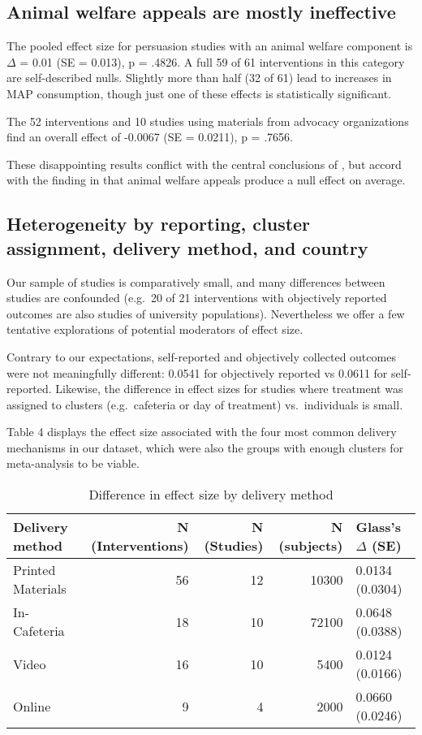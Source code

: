 \documentclass[sn-nature,pdflatex]{sn-jnl}
\begin{document}
\subsection{Animal welfare appeals are mostly ineffective}\label{sec2.9}

The pooled effect size for persuasion studies with an animal welfare
component is \(\Delta\) = 0.01 (SE = 0.013), p = .4826. A full 59 of 61
interventions in this category are self-described nulls. Slightly more
than half (32 of 61) lead to increases in MAP consumption, though just
one of these effects is statistically significant.

The 52 interventions and 10 studies using materials from advocacy
organizations find an overall effect of -0.0067 (SE = 0.0211), p =
.7656.

These disappointing results conflict with the central conclusions of
\citep{mathur2021effectiveness}, but accord with the finding in
\citep{DiGennaro2024} that animal welfare appeals produce a null effect
on average.

\subsection{Heterogeneity by reporting, cluster assignment, delivery
method, and country}\label{sec2.10}

Our sample of studies is comparatively small, and many differences
between studies are confounded (e.g.~20 of 21 interventions with
objectively reported outcomes are also studies of university
populations). Nevertheless we offer a few tentative explorations of
potential moderators of effect size.

Contrary to our expectations, self-reported and objectively collected
outcomes were not meaningfully different: 0.0541 for objectively
reported vs 0.0611 for self-reported. Likewise, the difference in effect
sizes for studies where treatment was assigned to clusters
(e.g.~cafeteria or day of treatment) vs.~individuals is small.

Table 4 displays the effect size associated with the four most common
delivery mechanisms in our dataset, which were also the groups with
enough clusters for meta-analysis to be viable.

\begin{table}[!h]
\centering
\caption{\label{tab:tab:table_four}Difference in effect size by delivery method}
\centering
\begin{tabular}[t]{lrrrl}
\toprule
Delivery method & N (Interventions) & N (Studies) & N (subjects) & Glass's $\Delta$ (SE)\\
\midrule
Printed Materials & 56 & 12 & 10300 & 0.0134 (0.0304)\\
In-Cafeteria & 18 & 10 & 72100 & 0.0648 (0.0388)\\
Video & 16 & 10 & 5400 & 0.0124 (0.0166)\\
Online & 9 & 4 & 2000 & 0.0660 (0.0246)\\
\bottomrule
\end{tabular}
\end{table}
\end{document}
